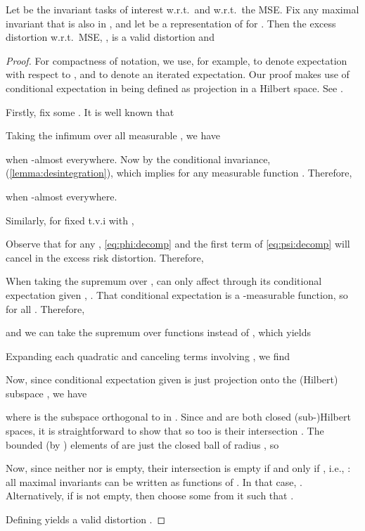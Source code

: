 \documentclass[final]{article}
\begin{document}
\begin{proposition}\label{appx:prop:invariant_distortion_mse}
Let  be the invariant tasks of interest w.r.t.\    and w.r.t.\ the MSE.
Fix any maximal invariant  that is also in , and let  be a representation of  for . 
Then the excess distortion  w.r.t.\ MSE, \disttextinv{}, is a valid distortion and

\end{proposition}
\begin{proof}
	For compactness of notation, we use, for example,  to denote expectation with respect to , and  to denote an iterated expectation. Our proof makes use of conditional expectation in  being defined as projection in a Hilbert space. See \citep[e.g.,][Ch.\ 22-23]{jacod_probability_2004}.

	Firstly, fix some . It is well known that
	
	Taking the infimum over all measurable , we have
	
	when  -almost everywhere. Now by the conditional invariance,  (\cref{lemma:desintegration}), which implies  for any measurable function . Therefore, 
	
	when  -almost everywhere.

	Similarly, for fixed  t.v.i  with ,
	

	Observe that for any , \eqref{eq:phi:decomp} and the first term of \eqref{eq:psi:decomp} will cancel in the excess risk distortion. Therefore, 
	
	
	When taking the supremum over ,  can only affect \disttextinv{} through its conditional expectation given , . That conditional expectation is a -measurable function, so  for all . Therefore,
	
	and we can take the supremum over functions  instead of , which yields
	
	Expanding each quadratic and canceling terms involving , we find
	
	
	Now, since conditional expectation given  is just projection onto the (Hilbert) subspace , we have
	
	where  is the subspace orthogonal to  in . Since  and  are both closed (sub-)Hilbert spaces, it is straightforward to show that so too is their intersection . The bounded (by ) elements of  are just the closed ball of radius , so 
	
	Now, since neither  nor  is empty, their intersection is empty if and only if , i.e., : all maximal invariants can be written as functions of . In that case, . Alternatively, if  is not empty, then choose some  from it such that .
	


	Defining  yields a valid distortion \disttextinv{}.
\end{proof}
\end{document}
